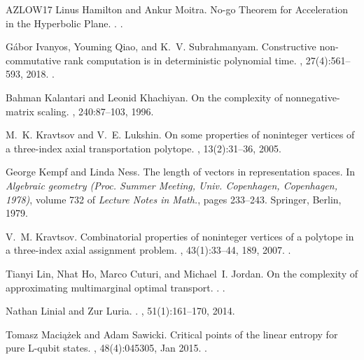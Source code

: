\documentclass[10pt,a4paper]{article}
\numberwithin{equation}{section}
\begin{document}
\begin{thebibliography}{AZLOW17}
Linus Hamilton and Ankur Moitra.
\newblock No-go {T}heorem for {A}cceleration in the {H}yperbolic {P}lane.
.
\newblock \href {http://arxiv.org/abs/2101.05657} {}.

G\'{a}bor Ivanyos, Youming Qiao, and K.~V. Subrahmanyam.
\newblock Constructive non-commutative rank computation is in deterministic
  polynomial time.
, 27(4):561--593, 2018.
\newblock \href {https://doi.org/10.1007/s00037-018-0165-7}
  {}.

Bahman Kalantari and Leonid Khachiyan.
\newblock On the complexity of nonnegative-matrix scaling.
, 240:87--103, 1996.

M.~K. Kravtsov and V.~E. Lukshin.
\newblock On some properties of noninteger vertices of a three-index axial
  transportation polytope.
, 13(2):31--36, 2005.

George Kempf and Linda Ness.
\newblock The length of vectors in representation spaces.
\newblock In {\em Algebraic geometry ({P}roc. {S}ummer {M}eeting, {U}niv.
  {C}openhagen, {C}openhagen, 1978)}, volume 732 of {\em Lecture Notes in
  Math.}, pages 233--243. Springer, Berlin, 1979.

V.~M. Kravtsov.
\newblock Combinatorial properties of noninteger vertices of a polytope in a
  three-index axial assignment problem.
, 43(1):33--44, 189, 2007.
\newblock \href {https://doi.org/10.1007/s10559-007-0023-0}
  {}.

Tianyi Lin, Nhat Ho, Marco Cuturi, and Michael~I. Jordan.
\newblock On the complexity of approximating multimarginal optimal transport.
.
\newblock \href {http://arxiv.org/abs/1910.00152} {}.

Nathan Linial and Zur Luria.
.
, 51(1):161--170, 2014.

Tomasz Maci{\k{a}}{\.{z}}ek and Adam Sawicki.
\newblock Critical points of the linear entropy for {pure L}-qubit states.
,
  48(4):045305, Jan 2015.
\newblock \href {https://doi.org/10.1088/1751-8113/48/4/045305}
  {}.


\end{thebibliography}
\end{document}
